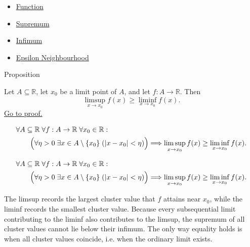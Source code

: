 \begin{dependencies}
\begin{itemize}
  \item \hyperref[def:function]{Function}
  \item \hyperref[def:supremum]{Supremum}
  \item \hyperref[def:infimum]{Infimum}
  \item \hyperref[def:epsilon-neighbourhood]{Epsilon Neighbourhood}
\end{itemize}
\end{dependencies}
\begin{propositionbox}{Proposition}
\begin{proposition}[$\limsup\geq\liminf$]
\label{prop:limsup-geq-liminf-function}
Let $A\subseteq \mathbb{R}$, let $x_0$ be a limit point of $A$, and let $f:A\to\mathbb{R}$. Then
\[
\limsup_{x\to x_0} f(x) \ge \liminf_{x\to x_0} f(x).
\]
\hyperref[prf:limsup-geq-liminf-function]{Go to proof.}
\end{proposition}
\end{propositionbox}

\begin{remark*}
\[
\begin{aligned}
&\forall A\subseteq\mathbb{R}\;\forall f:A\to\mathbb{R}\;\forall x_0\in\mathbb{R}:\\
&\qquad
\Bigl(\forall \eta>0\;\exists x\in A\setminus\{x_0\}\;(|x-x_0|<\eta)\Bigr)
\Longrightarrow
\limsup_{x\to x_0} f(x) \ge \liminf_{x\to x_0} f(x).
\end{aligned}
\]
\end{remark*}

\begin{remark*}
\[
\begin{aligned}
&\forall A\subseteq\mathbb{R}\;\forall f:A\to\mathbb{R}\;\forall x_0\in\mathbb{R}:\\
&\qquad
\Bigl(\forall \eta>0\;\exists x\in A\setminus\{x_0\}\;(|x-x_0|<\eta)\Bigr)
\Longrightarrow
\limsup_{x\to x_0} f(x) \ge \liminf_{x\to x_0} f(x).
\end{aligned}
\]
\end{remark*}

\begin{remark*}[Interpretation]
The limsup records the largest cluster value that $f$ attains near $x_0$, while the liminf records the smallest cluster value. Because every subsequential limit contributing to the liminf also contributes to the limsup, the supremum of all cluster values cannot lie below their infimum. The only way equality holds is when all cluster values coincide, i.e. when the ordinary limit exists.
\end{remark*}

